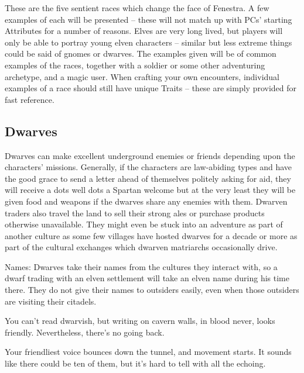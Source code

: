 \begin{multicols}{2}

These are the five sentient races which change the face of Fenestra.
A few examples of each will be presented -- these will not match up with PCs' starting Attributes for a number of reasons.
Elves are very long lived, but players will only be able to portray young elven characters -- similar but less extreme things could be said of gnomes or dwarves.
The examples given will be of common examples of the races, together with a soldier or some other adventuring archetype, and a magic user.
When crafting your own encounters, individual examples of a race should still have unique Traits -- these are simply provided for fast reference.

\subsection{Dwarves}

Dwarves can make excellent underground enemies or friends depending upon the characters' missions.
Generally, if the characters are law-abiding types and have the good grace to send a letter ahead of themselves politely asking for aid, they will receive a dots well dots a Spartan welcome but at the very least they will be given food and weapons if the dwarves share any enemies with them.
Dwarven traders also travel the land to sell their strong ales or purchase products otherwise unavailable.
They might even be stuck into an adventure as part of another culture as some few villages have hosted dwarves for a decade or more as part of the cultural exchanges which dwarven matriarchs occasionally drive.

Names: Dwarves take their names from the cultures they interact with, so a dwarf trading with an elven settlement will take an elven name during his time there.
They do not give their names to outsiders easily, even when those outsiders are visiting their citadels.

\begin{boxtext}

	You can't read dwarvish, but writing on cavern walls, in blood never, looks friendly.
	Nevertheless, there's no going back.

\end{boxtext}

\begin{boxtext}

	Your friendliest voice bounces down the tunnel, and movement starts.
	It sounds like there could be ten of them, but it's hard to tell with all the echoing.


\end{boxtext}
\end{multicols}
